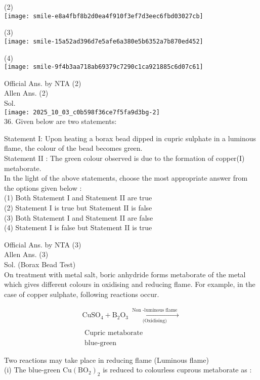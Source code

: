 \documentclass[10pt]{article}
\begin{document}
(2)\\
\texttt{[image: smile-e8a4fbf8b2d0ea4f910f3ef7d3eec6fbd03027cb]}

(3)\\
\texttt{[image: smile-15a52ad396d7e5afe6a380e5b6352a7b870ed452]}

(4)\\
\texttt{[image: smile-9f4b3aa718ab69379c7290c1ca921885c6d07c61]}

Official Ans. by NTA (2)\\
Allen Ans. (2)\\
Sol.\\
\texttt{[image: 2025\_10\_03\_c0b598f36ce7f5fa9d3bg-2]}\\
36. Given below are two statements:

Statement I: Upon heating a borax bead dipped in cupric sulphate in a luminous flame, the colour of the bead becomes green.\\
Statement II : The green colour observed is due to the formation of copper(I) metaborate.\\
In the light of the above statements, choose the most appropriate answer from the options given below :\\
(1) Both Statement I and Statement II are true\\
(2) Statement I is true but Statement II is false\\
(3) Both Statement I and Statement II are false\\
(4) Statement I is false but Statement II is true

Official Ans. by NTA (3)\\
Allen Ans. (3)\\
Sol. (Borax Bead Test)\\
On treatment with metal salt, boric anhydride forms metaborate of the metal which gives different colours in oxidising and reducing flame. For example, in the case of copper sulphate, following reactions occur.

\[
\begin{array}{r}
\mathrm{CuSO}_{4}+\mathrm{B}_{2} \mathrm{O}_{3} \xrightarrow[\text { (Oxidising) }]{\text { Non -luminous flame }} \\
\\
\text { Cupric metaborate } \\
\text { blue-green }
\end{array}
\]

Two reactions may take place in reducing flame (Luminous flame)\\
(i) The blue-green \(\mathrm{Cu}\left(\mathrm{BO}_{2}\right)_{2}\) is reduced to colourless cuprous metaborate as :
\end{document}
